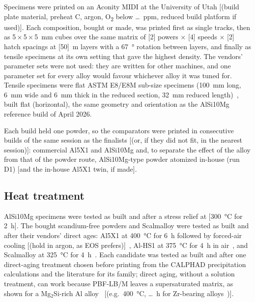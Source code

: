 \documentclass[preprint,12pt]{elsarticle}
\newcommand{\note}[1]{}
\newcommand{\note}[1]{\textcolor{blue!70!black}{\textsf{\footnotesize [Note: #1]}}}
\newcommand{\placeholder}[1]{\textcolor{red!75!black}{[#1]}}
\newcommand{\Scal}{Scalmalloy\xspace}
\newcommand{\AlSi}{AlSi10Mg\xspace}
\begin{document}
Specimens were printed on an Aconity MIDI at the University of Utah \placeholder{(build plate material, preheat \textdegree C, argon, O\textsubscript{2} below \dots~ppm, reduced build platform if used)}.
Each composition, bought or made, was printed first as single tracks, then as 5\,$\times$\,5\,$\times$\,5~mm cubes over the same matrix of \placeholder{2} powers $\times$ \placeholder{4} speeds $\times$ \placeholder{2} hatch spacings at \placeholder{50}~\textmu m layers with a \SI{67}{\degree} rotation between layers, and finally as tensile specimens at its own setting that gave the highest density. The vendors' parameter sets were not used: they are written for other machines, and one parameter set for every alloy would favour whichever alloy it was tuned for.
Tensile specimens were flat ASTM E8/E8M sub-size specimens (\SI{100}{mm} long, \SI{6}{mm} wide and \SI{6}{mm} thick in the reduced section, \SI{32}{mm} reduced length)~\cite{astm_e8}, built flat (horizontal), the same geometry and orientation as the \AlSi reference build of April 2026.
\note{The April coupons' dimensions (PR \#288) match the E8/E8M sub-size outline, but the project records don't call them E8 sub-size; confirm against the drawing in \#138 before saying so.}
Each build held one powder, so the comparators were printed in consecutive builds of the same session as the finalists \placeholder{(or, if they did not fit, in the nearest session)}: commercial Al5X1 and \AlSi and, to separate the effect of the alloy from that of the powder route, \AlSi-type powder atomized in-house (run D1) \placeholder{and the in-house Al5X1 twin, if made}.

\subsection{Heat treatment}

\AlSi specimens were tested as built and after a stress relief at \placeholder{\SI{300}{\celsius} for \SI{2}{h}}. The bought scandium-free powders and \Scal were tested as built and after their vendors' direct ages: Al5X1 at \SI{400}{\celsius} for \SI{6}{h} followed by forced-air cooling \placeholder{(hold in argon, as EOS prefers)}~\cite{mds_al5x1}, Al-HS1 at \SI{375}{\celsius} for \SI{4}{h} in air~\cite{ds_hoganas}, and \Scal at \SI{325}{\celsius} for \SI{4}{h}~\cite{ds_colibrium}.
Each candidate was tested as built and after one direct-aging treatment chosen before printing from the CALPHAD precipitation calculations and the literature for its family; direct aging, without a solution treatment, can work because PBF-LB/M leaves a supersaturated matrix, as shown for a Mg$_2$Si-rich Al alloy~\cite{solanki2026} \placeholder{(e.g.\ \SI{400}{\celsius}, \dots~h for Zr-bearing alloys~\cite{croteau2018})}.
\end{document}
